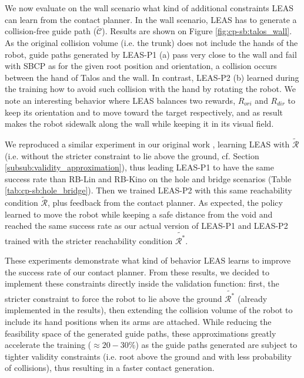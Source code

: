 We now evaluate on the wall scenario what kind of additional constraints LEAS can learn from the contact planner. In the wall scenario, LEAS has to generate a collision-free guide path ($\tilde{\mathcal{C}}$).
Results are shown on Figure \ref{fig:cp-sb:talos_wall}.
As the original collision volume (i.e. the trunk) does not include the hands of the robot, guide paths generated by LEAS-P1 (a) pass very close to the wall and fail with SBCP as for the given root position and orientation, a collision occurs between the hand of Talos and the wall.
In contrast, LEAS-P2 (b) learned during the training how to avoid such collision with the hand by rotating the robot.
We note an interesting behavior where LEAS balances two rewards, $R_{ori}$ and $R_{dir}$ to keep its orientation and to move toward the target respectively, and as result makes the robot sidewalk along the wall while keeping it in its visual field.

We reproduced a similar experiment in our original work \cite{LEAS}, learning LEAS with $\tilde{\mathcal{R}}$ (i.e. without the stricter constraint to lie above the ground, cf. Section \ref{subsub:validity_approximation}), thus leading LEAS-P1 to have the same success rate than RB-Lin and RB-Kino on the hole and bridge scenarios (Table \ref{tab:cp-sb:hole_bridge}).
Then we trained LEAS-P2 with this same reachability condition $\tilde{\mathcal{R}}$, plus feedback from the contact planner.
As expected, the policy learned to move the robot while keeping a safe distance from the void and reached the same success rate as our actual version of LEAS-P1 and LEAS-P2 trained with the stricter reachability condition $\tilde{\mathcal{R}^*}$.

These experiments demonstrate what kind of behavior LEAS learns to improve the success rate of our contact planner. 
From these results, we decided to implement these constraints directly inside the validation function: first, the stricter constraint to force the robot to lie above the ground $\tilde{\mathcal{R}^*}$ (already implemented in the results), then extending the collision volume of the robot to include its hand positions when its arms are attached.
While reducing the feasibility space of the generated guide paths, these approximations greatly accelerate the training ($\approx 20-30$\%) as the guide paths generated are subject to tighter validity constraints (i.e. root above the ground and with less probability of collisions), thus resulting in a faster contact generation.



